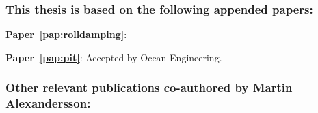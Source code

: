 
\subsubsection*{\normalfont \color{black} \textbf{This thesis is based on the following appended papers:}}

\noindent\begin{minipage}[adjusting]{\linewidth}
\textbf{Paper~\ref{pap:rolldamping}}: 
\end{minipage}
\vspace{0.25cm}
\newline
\noindent\begin{minipage}[adjusting]{\linewidth}
\textbf{Paper~\ref{pap:pit}}: 
Accepted by Ocean Engineering.
\end{minipage}
\newpage
\subsubsection*{\normalfont \color{black} \textbf{Other relevant publications co-authored by Martin Alexandersson:}} 
\normalsize
\newcommand{\ME}{{\bfseries Martin Alexandersson}}

\noindent\begin{minipage}[adjusting]{\linewidth}
\end{minipage}
\vspace{0.25cm}
\newline
\noindent\begin{minipage}[adjusting]{\linewidth}

\end{minipage}


